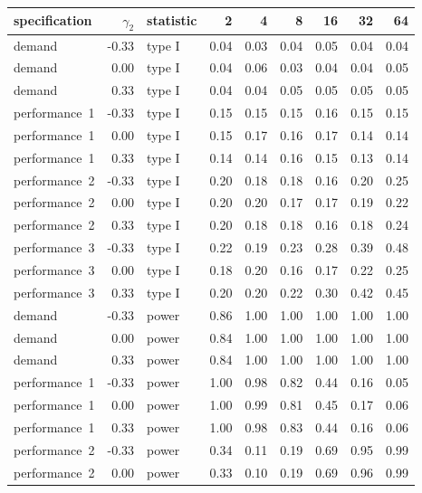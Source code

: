 \begin{table}[ht]
\centering
\begingroup\footnotesize
\begin{tabular}{lrlrrrrrr}
  \hline
specification & $\gamma_2$ & statistic & 2 & 4 & 8 & 16 & 32 & 64 \\ 
  \hline
demand & -0.33 & type I & 0.04 & 0.03 & 0.04 & 0.05 & 0.04 & 0.04 \\ 
  demand & 0.00 & type I & 0.04 & 0.06 & 0.03 & 0.04 & 0.04 & 0.05 \\ 
  demand & 0.33 & type I & 0.04 & 0.04 & 0.05 & 0.05 & 0.05 & 0.05 \\ 
  performance~1 & -0.33 & type I & 0.15 & 0.15 & 0.15 & 0.16 & 0.15 & 0.15 \\ 
  performance~1 & 0.00 & type I & 0.15 & 0.17 & 0.16 & 0.17 & 0.14 & 0.14 \\ 
  performance~1 & 0.33 & type I & 0.14 & 0.14 & 0.16 & 0.15 & 0.13 & 0.14 \\ 
  performance~2 & -0.33 & type I & 0.20 & 0.18 & 0.18 & 0.16 & 0.20 & 0.25 \\ 
  performance~2 & 0.00 & type I & 0.20 & 0.20 & 0.17 & 0.17 & 0.19 & 0.22 \\ 
  performance~2 & 0.33 & type I & 0.20 & 0.18 & 0.18 & 0.16 & 0.18 & 0.24 \\ 
  performance~3 & -0.33 & type I & 0.22 & 0.19 & 0.23 & 0.28 & 0.39 & 0.48 \\ 
  performance~3 & 0.00 & type I & 0.18 & 0.20 & 0.16 & 0.17 & 0.22 & 0.25 \\ 
  performance~3 & 0.33 & type I & 0.20 & 0.20 & 0.22 & 0.30 & 0.42 & 0.45 \\ 
  demand & -0.33 & power & 0.86 & 1.00 & 1.00 & 1.00 & 1.00 & 1.00 \\ 
  demand & 0.00 & power & 0.84 & 1.00 & 1.00 & 1.00 & 1.00 & 1.00 \\ 
  demand & 0.33 & power & 0.84 & 1.00 & 1.00 & 1.00 & 1.00 & 1.00 \\ 
  performance~1 & -0.33 & power & 1.00 & 0.98 & 0.82 & 0.44 & 0.16 & 0.05 \\ 
  performance~1 & 0.00 & power & 1.00 & 0.99 & 0.81 & 0.45 & 0.17 & 0.06 \\ 
  performance~1 & 0.33 & power & 1.00 & 0.98 & 0.83 & 0.44 & 0.16 & 0.06 \\ 
  performance~2 & -0.33 & power & 0.34 & 0.11 & 0.19 & 0.69 & 0.95 & 0.99 \\ 
  performance~2 & 0.00 & power & 0.33 & 0.10 & 0.19 & 0.69 & 0.96 & 0.99 \\ 

\end{tabular}
\end{table}
